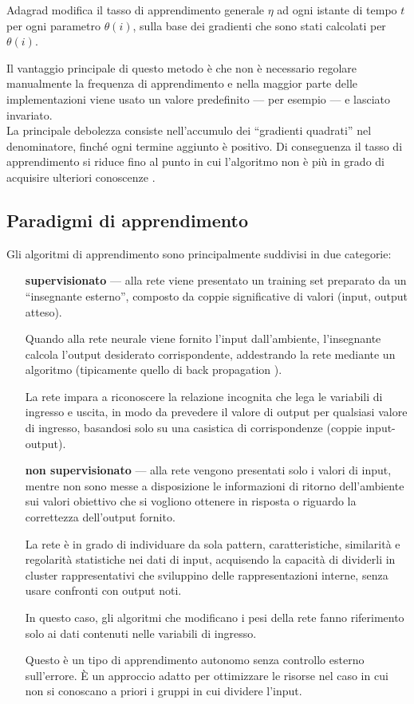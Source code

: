 Adagrad modifica il tasso di apprendimento generale $\eta$ ad ogni istante di tempo $t$ per ogni parametro $\theta(i)$, sulla base dei gradienti che sono stati calcolati per $\theta(i)$.

Il vantaggio principale di questo metodo è che non è necessario regolare manualmente la frequenza di apprendimento e nella maggior parte delle implementazioni viene usato un valore predefinito --- per esempio  --- e lasciato invariato.\\
La principale debolezza consiste nell'accumulo dei ``gradienti quadrati'' nel denominatore, finché ogni termine aggiunto è positivo. Di conseguenza il tasso di apprendimento si riduce fino al punto in cui l'algoritmo non è più in grado di acquisire ulteriori conoscenze \cite{ruder2016overview}. 

\subsection{Paradigmi di apprendimento}
\label{subsec:Paradigmi di apprendimento}

Gli algoritmi di apprendimento sono principalmente suddivisi in due categorie:
\begin{itemize}
	\item[\bfseries supervisionato] --- alla rete viene presentato un training set preparato da un ``insegnante esterno'', composto da coppie significative di valori (input, output atteso).
	
	Quando alla rete neurale viene fornito l'input dall'ambiente, l'insegnante calcola l'output desiderato corrispondente, addestrando la rete mediante un algoritmo (tipicamente quello di back propagation \cite{horikawa1992fuzzy}). 
	
	La rete impara a riconoscere la relazione incognita che lega le variabili di ingresso e uscita, in modo da prevedere il valore di output per qualsiasi valore di ingresso, basandosi solo su una casistica di corrispondenze (coppie input-output).
	
	\item[\bfseries non supervisionato] --- alla rete vengono presentati solo i valori di input, mentre non sono messe a disposizione le informazioni di ritorno dell'ambiente sui valori obiettivo che si vogliono ottenere in risposta o riguardo la correttezza dell'output fornito.
	
	La rete è in grado di individuare da sola pattern, caratteristiche, similarità e regolarità statistiche nei dati di input, acquisendo la capacità di dividerli in cluster rappresentativi che sviluppino delle rappresentazioni interne, senza usare confronti con output noti.
	
	In questo caso, gli algoritmi che modificano i pesi della rete fanno riferimento solo ai dati contenuti nelle variabili di ingresso.
	
	Questo è un tipo di apprendimento autonomo senza controllo esterno sull'errore. È un approccio adatto per ottimizzare le risorse nel caso in cui non si conoscano a priori i gruppi in cui dividere l'input.
\end{itemize}

